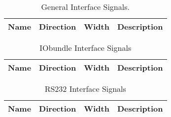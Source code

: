 \begin{table}[H]
  \centering
  \begin{tabular}{|l|l|r|p{10.5cm}|}

    \hline
    \rowcolor{iob-green}
    {\bf Name} & {\bf Direction} & {\bf Width} & {\bf Description}  \\ \hline \hline

    

  \end{tabular}
  \caption{General Interface Signals.}
  \label{gen_if_tab:is}
\end{table}

\begin{table}[H]
  \centering
  \begin{tabular}{|l|l|r|p{8.5cm}|}

    \hline
    \rowcolor{iob-green}
    {\bf Name} & {\bf Direction} & {\bf Width} & {\bf Description}  \\ \hline \hline

    

  \end{tabular}
  \caption{IObundle Interface Signals}
  \label{tab:if_iob_s}
\end{table}

\begin{table}[H]
  \centering
  \begin{tabular}{|l|l|r|p{9.5cm}|}
    
    \hline
    \rowcolor{iob-green}
    {\bf Name} & {\bf Direction} & {\bf Width} & {\bf Description}  \\ \hline \hline

    
 
  \end{tabular}
  \caption{RS232 Interface Signals}
  \label{tab:if_rs232}
\end{table}

%
